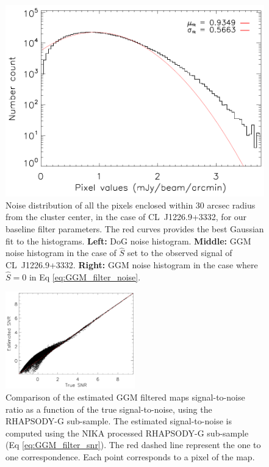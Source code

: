 \documentclass[twocolumn,traditabstract]{aa}
\begin{document}
\begin{figure}[h]
\includegraphics[trim=0cm 0cm 0cm 0cm, clip=true, totalheight=4.4cm]{Figure/GGM_noise_stat_CLJ1227_NoSignal.pdf}
\caption{\footnotesize{Noise distribution of all the pixels enclosed within 30 arcsec radius from the cluster center, in the case of \mbox{CL~J1226.9+3332}, for our baseline filter parameters. The red curves provides the best Gaussian fit to the histograms. {\bf Left:} DoG noise histogram. {\bf Middle:} GGM noise histogram in the case of $\hat{S}$ set to the observed signal of \mbox{CL~J1226.9+3332}. {\bf Right:} GGM noise histogram in the case where $\hat{S} = 0$ in Eq \ref{eq:GGM_filter_noise}.}}
\label{fig:noise_statistics1}
\end{figure}

\begin{figure}[h]
\centering
\includegraphics[width=0.5\textwidth]{Figure/Conta_noise_Grad_SNRtrueVSmeasRG377_00181_Ymap_zobs0p5_15_15_45.pdf}
\caption{\footnotesize{Comparison of the estimated GGM filtered maps signal-to-noise ratio as a function of the true signal-to-noise, using the RHAPSODY-G sub-sample. The estimated signal-to-noise is computed using the NIKA processed RHAPSODY-G sub-sample (Eq \ref{eq:GGM_filter_snr}). The red dashed line represent the one to one correspondence. Each point corresponds to a pixel of the map.}}
\label{fig:noise_statistics2}
\end{figure}
\end{document}
